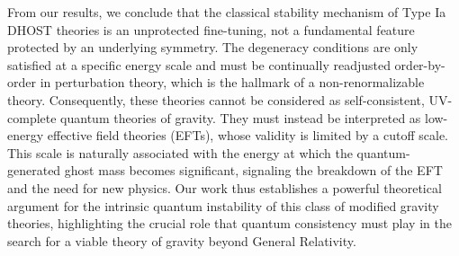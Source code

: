 \documentclass[twocolumn]{aastex631}
\begin{document}
From our results, we conclude that the classical stability mechanism of Type Ia DHOST theories is an unprotected fine-tuning, not a fundamental feature protected by an underlying symmetry. The degeneracy conditions are only satisfied at a specific energy scale and must be continually readjusted order-by-order in perturbation theory, which is the hallmark of a non-renormalizable theory. Consequently, these theories cannot be considered as self-consistent, UV-complete quantum theories of gravity. They must instead be interpreted as low-energy effective field theories (EFTs), whose validity is limited by a cutoff scale. This scale is naturally associated with the energy at which the quantum-generated ghost mass becomes significant, signaling the breakdown of the EFT and the need for new physics. Our work thus establishes a powerful theoretical argument for the intrinsic quantum instability of this class of modified gravity theories, highlighting the crucial role that quantum consistency must play in the search for a viable theory of gravity beyond General Relativity.

{}

\end{document}
